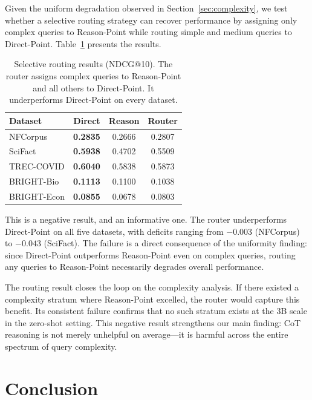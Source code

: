 \documentclass[sigconf,review]{acmart}
\begin{document}
Given the uniform degradation observed in Section~\ref{sec:complexity}, we test whether a selective routing strategy can recover performance by assigning only complex queries to Reason-Point while routing simple and medium queries to Direct-Point. Table~\ref{tab:routing} presents the results.

\begin{table}[t]
\caption{Selective routing results (NDCG@10). The router assigns complex queries to Reason-Point and all others to Direct-Point. It underperforms Direct-Point on every dataset.}
\label{tab:routing}
\centering
\small
\begin{tabular}{lccc}
\toprule
\textbf{Dataset} & \textbf{Direct} & \textbf{Reason} & \textbf{Router} \\
\midrule
NFCorpus    & \textbf{0.2835} & 0.2666 & 0.2807 \\
SciFact     & \textbf{0.5938} & 0.4702 & 0.5509 \\
TREC-COVID  & \textbf{0.6040} & 0.5838 & 0.5873 \\
BRIGHT-Bio  & \textbf{0.1113} & 0.1100 & 0.1038 \\
BRIGHT-Econ & \textbf{0.0855} & 0.0678 & 0.0803 \\
\bottomrule
\end{tabular}
\end{table}

This is a negative result, and an informative one. The router underperforms Direct-Point on all five datasets, with deficits ranging from $-0.003$ (NFCorpus) to $-0.043$ (SciFact). The failure is a direct consequence of the uniformity finding: since Direct-Point outperforms Reason-Point even on complex queries, routing any queries to Reason-Point necessarily degrades overall performance.

The routing result closes the loop on the complexity analysis. If there existed a complexity stratum where Reason-Point excelled, the router would capture this benefit. Its consistent failure confirms that no such stratum exists at the 3B scale in the zero-shot setting. This negative result strengthens our main finding: CoT reasoning is not merely unhelpful on average---it is harmful across the entire spectrum of query complexity.

\section{Conclusion}
\end{document}
